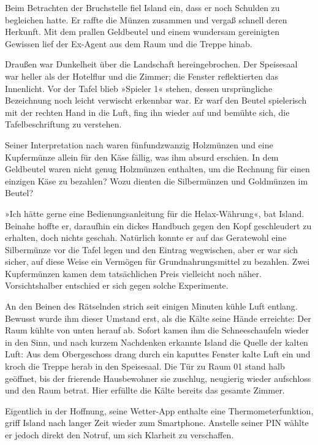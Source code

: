 Beim Betrachten der Bruchstelle fiel Island ein, dass er noch Schulden zu begleichen hatte. Er raffte die Münzen zusammen und vergaß schnell deren Herkunft. Mit dem prallen Geldbeutel und einem wundersam gereinigten Gewissen lief der Ex-Agent aus dem Raum und die Treppe hinab.

Draußen war Dunkelheit über die Landschaft hereingebrochen. Der Speisesaal war heller als der Hotelflur und die Zimmer; die Fenster reflektierten das Innenlicht. Vor der Tafel blieb »Spieler 1« stehen, dessen ursprüngliche Bezeichnung noch leicht verwischt erkennbar war. Er warf den Beutel spielerisch mit der rechten Hand in die Luft, fing ihn wieder auf und bemühte sich, die Tafelbeschriftung zu verstehen.


Seiner Interpretation nach waren fünfundzwanzig Holzmünzen und eine Kupfermünze allein für den Käse fällig, was ihm absurd erschien. In dem Geldbeutel waren nicht genug Holzmünzen enthalten, um die Rechnung für einen einzigen Käse zu bezahlen? Wozu dienten die Silbermünzen und Goldmünzen im Beutel?

»Ich hätte gerne eine Bedienungsanleitung für die Helax-Währung«, bat Island. Beinahe hoffte er, daraufhin ein dickes Handbuch gegen den Kopf geschleudert zu erhalten, doch nichts geschah. Natürlich konnte er auf das Geratewohl eine Silbermünze vor die Tafel legen und den Eintrag wegwischen, aber er war sich sicher, auf diese Weise ein Vermögen für Grundnahrungsmittel zu bezahlen. Zwei Kupfermünzen kamen dem tatsächlichen Preis vielleicht noch näher. Vorsichtshalber entschied er sich gegen solche Experimente.

An den Beinen des Rätselnden strich seit einigen Minuten kühle Luft entlang. Bewusst wurde ihm dieser Umstand erst, als die Kälte seine Hände erreichte: Der Raum kühlte von unten herauf ab. Sofort kamen ihm die Schneeschaufeln wieder in den Sinn, und nach kurzem Nachdenken erkannte Island die Quelle der kalten Luft: Aus dem Obergeschoss drang durch ein kaputtes Fenster kalte Luft ein und kroch die Treppe herab in den Speisesaal. Die Tür zu Raum 01 stand halb geöffnet, bis der frierende Hausbewohner sie zuschlug, neugierig wieder aufschloss und den Raum betrat. Hier erfüllte die Kälte bereits das gesamte Zimmer.

Eigentlich in der Hoffnung, seine Wetter-App enthalte eine Thermometerfunktion, griff Island nach langer Zeit wieder zum Smartphone. Anstelle seiner PIN wählte er jedoch direkt den Notruf, um sich Klarheit zu verschaffen.

